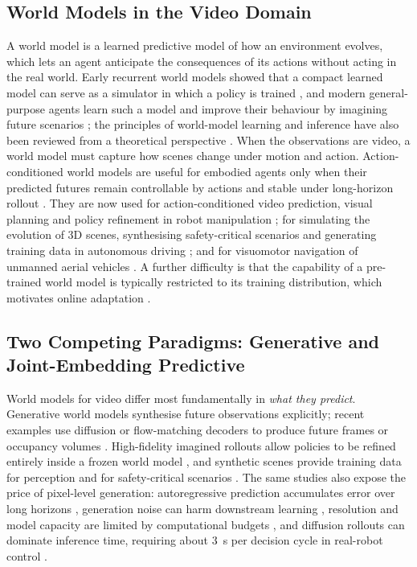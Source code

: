 \documentclass[conference,a4paper]{IEEEtran}
\begin{document}
\subsection{World Models in the Video Domain}
A world model is a learned predictive model of how an environment evolves, which lets an agent anticipate the consequences of its actions without acting in the real world. Early recurrent world models showed that a compact learned model can serve as a simulator in which a policy is trained \cite{ha2018world}, and modern general-purpose agents learn such a model and improve their behaviour by imagining future scenarios \cite{hafner2025dreamerv3}; the principles of world-model learning and inference have also been reviewed from a theoretical perspective \cite{friston2021world}. When the observations are video, a world model must capture how scenes change under motion and action. Action-conditioned world models are useful for embodied agents only when their predicted futures remain controllable by actions and stable under long-horizon rollout \cite{wang2026sampopp}. They are now used for action-conditioned video prediction, visual planning and policy refinement in robot manipulation \cite{guo2026flowdreamer,jiang2026world4rl,qi2026gpc}; for simulating the evolution of 3D scenes, synthesising safety-critical scenarios and generating training data in autonomous driving \cite{wang2026occsora,guan2025accident,li2026nrseg}; and for visuomotor navigation of unmanned aerial vehicles \cite{zhao2024stc}. A further difficulty is that the capability of a pre-trained world model is typically restricted to its training distribution, which motivates online adaptation \cite{moon2026spread}.

\subsection{Two Competing Paradigms: Generative and Joint-Embedding Predictive}
World models for video differ most fundamentally in \emph{what they predict}. Generative world models synthesise future observations explicitly; recent examples use diffusion or flow-matching decoders to produce future frames or occupancy volumes \cite{jiang2026world4rl,guo2026flowdreamer,wang2026occsora,wang2026sampopp,guan2025accident}. High-fidelity imagined rollouts allow policies to be refined entirely inside a frozen world model \cite{jiang2026world4rl}, and synthetic scenes provide training data for perception and for safety-critical scenarios \cite{li2026nrseg,guan2025accident}. The same studies also expose the price of pixel-level generation: autoregressive prediction accumulates error over long horizons \cite{wang2026occsora}, generation noise can harm downstream learning \cite{li2026nrseg}, resolution and model capacity are limited by computational budgets \cite{jiang2026world4rl}, and diffusion rollouts can dominate inference time, requiring about 3~s per decision cycle in real-robot control \cite{qi2026gpc}.
\end{document}
